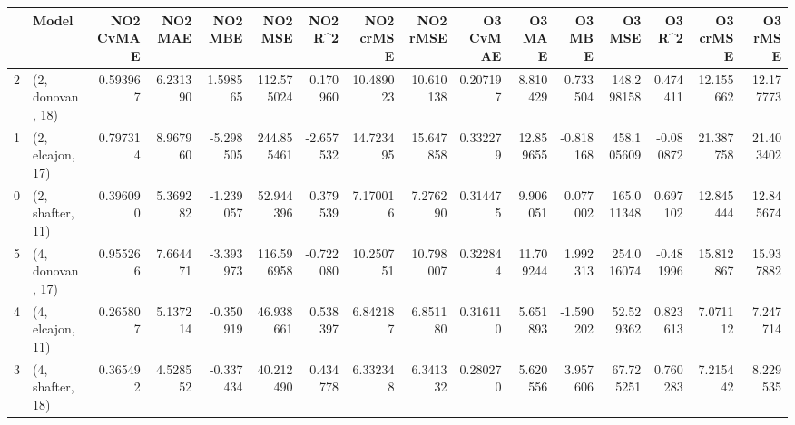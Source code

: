 \begin{tabular}{llrrrrrrrrrrrrrr}
\toprule
{} &             Model &  NO2 CvMAE &   NO2 MAE &   NO2 MBE &     NO2 MSE &   NO2 R\textasciicircum2 &  NO2 crMSE &   NO2 rMSE &  O3 CvMAE &     O3 MAE &    O3 MBE &      O3 MSE &    O3 R\textasciicircum2 &   O3 crMSE &    O3 rMSE \\
\midrule
2 &  (2, donovan, 18) &   0.593967 &  6.231390 &  1.598565 &  112.575024 &  0.170960 &  10.489023 &  10.610138 &  0.207197 &   8.810429 &  0.733504 &  148.298158 &  0.474411 &  12.155662 &  12.177773 \\
1 &  (2, elcajon, 17) &   0.797314 &  8.967960 & -5.298505 &  244.855461 & -2.657532 &  14.723495 &  15.647858 &  0.332279 &  12.859655 & -0.818168 &  458.105609 & -0.080872 &  21.387758 &  21.403402 \\
0 &  (2, shafter, 11) &   0.396090 &  5.369282 & -1.239057 &   52.944396 &  0.379539 &   7.170016 &   7.276290 &  0.314475 &   9.906051 &  0.077002 &  165.011348 &  0.697102 &  12.845444 &  12.845674 \\
5 &  (4, donovan, 17) &   0.955266 &  7.664471 & -3.393973 &  116.596958 & -0.722080 &  10.250751 &  10.798007 &  0.322844 &  11.709244 &  1.992313 &  254.016074 & -0.481996 &  15.812867 &  15.937882 \\
4 &  (4, elcajon, 11) &   0.265807 &  5.137214 & -0.350919 &   46.938661 &  0.538397 &   6.842187 &   6.851180 &  0.316110 &   5.651893 & -1.590202 &   52.529362 &  0.823613 &   7.071112 &   7.247714 \\
3 &  (4, shafter, 18) &   0.365492 &  4.528552 & -0.337434 &   40.212490 &  0.434778 &   6.332348 &   6.341332 &  0.280270 &   5.620556 &  3.957606 &   67.725251 &  0.760283 &   7.215442 &   8.229535 \\
\bottomrule
\end{tabular}
